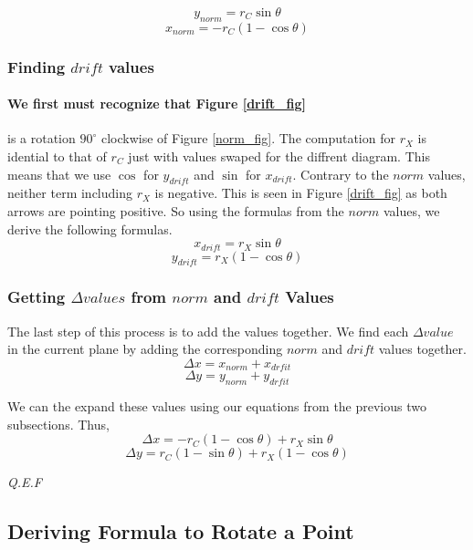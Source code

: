 \documentclass[12pt]{article}
\begin{document}
\centering
$$y_{norm} = r_C \sin\theta$$
$$x_{norm} = -r_C(1-\cos\theta)$$

\raggedright
\pagebreak
\subsubsection{Finding $drift$ values}
\paragraph{We first must recognize that Figure \ref{drift_fig}} is a rotation $90^{\circ}$ clockwise of Figure \ref{norm_fig}. The computation for $r_X$ is idential to that of $r_C$ just with values swaped for the diffrent diagram. This means that we use $\cos$ for $y_{drift}$ and $\sin$ for $x_{drift}$. Contrary to the $norm$ values, neither term including $r_X$ is negative. This is seen in Figure \ref{drift_fig} as both arrows are pointing positive. So using the formulas from the $norm$ values, we derive the following formulas.
$$ x_{drift} = r_X \sin\theta$$
$$ y_{drift} = r_X (1-\cos\theta)$$

\subsubsection{Getting $\Delta values$ from $norm$ and $drift$ Values}
The last step of this process is to add the values together. We find each $\Delta value$ in the current plane by adding the corresponding $norm$ and $drift$ values together.
$$ \Delta x = x_{norm} + x_{drfit} $$
$$ \Delta y = y_{norm} + y_{drfit} $$

We can the expand these values using our equations from the previous two subsections. Thus,
$$ \Delta x =  -r_C (1-\cos\theta) + r_X \sin\theta $$
$$ \Delta y =  r_C (1-\sin\theta) + r_X (1-\cos\theta) $$

\textit{Q.E.F}

\subsection{Deriving Formula to Rotate a Point}
\end{document}

